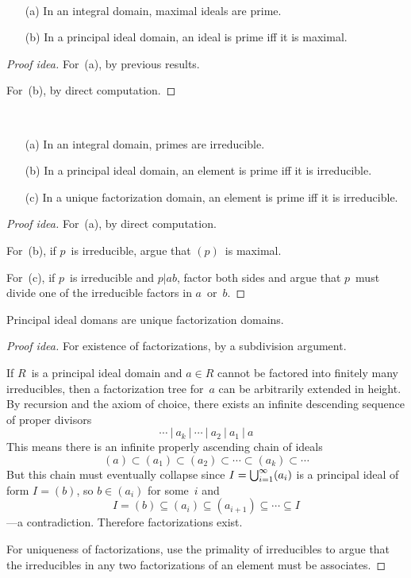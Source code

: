 \begin{thm}
\ 
\begin{enumerate}[itemsep=0pt]
\item[(a)] In an integral domain, maximal ideals are prime.
\item[(b)] In a principal ideal domain, an ideal is prime iff it is maximal. 
\end{enumerate}
\end{thm}
\begin{proof}[Proof idea]
For~(a), by previous results.

For~(b), by direct computation.
\end{proof}

\begin{thm}
\ 
\begin{enumerate}[itemsep=0pt]
\item[(a)] In an integral domain, primes are irreducible.
\item[(b)] In a principal ideal domain, an element is prime iff it is irreducible.
\item[(c)] In a unique factorization domain, an element is prime iff it is irreducible.
\end{enumerate}
\end{thm}
\begin{proof}[Proof idea]
For~(a), by direct computation.

For~(b), if \(p\)~is irreducible, argue that \((p)\)~is maximal.

For~(c), if \(p\)~is irreducible and \(p|ab\), factor both sides and argue that \(p\)~must divide one of the irreducible factors in \(a\)~or~\(b\).
\end{proof}

\begin{thm}
Principal ideal domans are unique factorization domains.
\end{thm}
\begin{proof}[Proof idea]
For existence of factorizations, by a subdivision argument.

If \(R\)~is a principal ideal domain and \(a\in R\) cannot be factored into finitely many irreducibles, then a factorization tree for~\(a\) can be arbitrarily extended in height. By recursion and the axiom of choice, there exists an infinite descending sequence of proper divisors
\[\cdots\ |\ a_k\ |\ \cdots\ |\ a_2\ |\ a_1\ |\ a\]
This means there is an infinite properly ascending chain of ideals
\[(a)\subset(a_1)\subset(a_2)\subset\cdots\subset(a_k)\subset\cdots\]
But this chain must eventually collapse since \(I=\bigcup_{i=1}^{\infty}(a_i)\) is a principal ideal of form \(I=(b)\), so \(b\in(a_i)\) for some~\(i\) and
\[I=(b)\subseteq(a_i)\subseteq(a_{i+1})\subseteq\cdots\subseteq I\]
---a contradiction. Therefore factorizations exist.

For uniqueness of factorizations, use the primality of irreducibles to argue that the irreducibles in any two factorizations of an element must be associates.
\end{proof}

